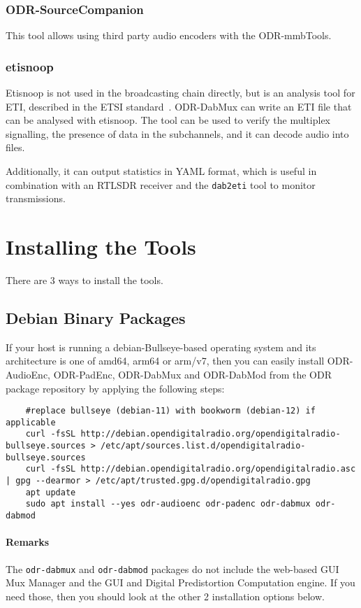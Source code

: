 \subsubsection{ODR-SourceCompanion}
This tool allows using third party audio encoders with the ODR-mmbTools.

\subsubsection{etisnoop}
Etisnoop is not used in the broadcasting chain directly, but is an analysis tool
for ETI, described in the ETSI standard~\cite{etsidabeti}. ODR-DabMux can write
an ETI file that can be analysed with etisnoop. The tool can be used to verify
the multiplex signalling, the presence of data in the subchannels, and it can
decode audio into files.

Additionally, it can output statistics in YAML format, which is useful in
combination with an RTLSDR receiver and the \verb+dab2eti+ tool to monitor
transmissions.

\clearpage
\section{Installing the Tools}
There are 3 ways to install the tools.

\subsection{Debian Binary Packages}
If your host is running a debian-Bullseye-based operating system and its
architecture is one of amd64, arm64 or arm/v7, then you can easily install
ODR-AudioEnc, ODR-PadEnc, ODR-DabMux and ODR-DabMod
from the ODR package repository by applying the following steps:

\begin{lstlisting}
    #replace bullseye (debian-11) with bookworm (debian-12) if applicable
    curl -fsSL http://debian.opendigitalradio.org/opendigitalradio-bullseye.sources > /etc/apt/sources.list.d/opendigitalradio-bullseye.sources
    curl -fsSL http://debian.opendigitalradio.org/opendigitalradio.asc | gpg --dearmor > /etc/apt/trusted.gpg.d/opendigitalradio.gpg
    apt update
    sudo apt install --yes odr-audioenc odr-padenc odr-dabmux odr-dabmod
\end{lstlisting}

\paragraph{Remarks}
The \texttt{odr-dabmux} and \texttt{odr-dabmod} packages do not include the web-based GUI Mux Manager
and the GUI and Digital Predistortion Computation engine. If you need those, then you
should look at the other 2 installation options below.

